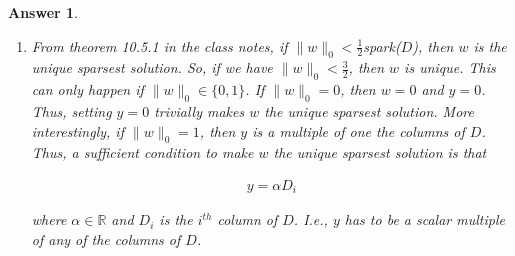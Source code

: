 \documentclass[12pt]{article}
\theoremstyle{colon}
\newtheorem*{answer}{Answer}
\begin{document}
\begin{answer}
\begin{enumerate}[label=\alph*)]
    \item From theorem 10.5.1 in the class notes, if $\lVert w \rVert_0 < \frac{1}{2}$spark($D$), then $w$ is the unique sparsest solution. So, if we have $\lVert w \rVert_0 < \frac{3}{2}$, then $w$ is unique. This can only happen if $\lVert w \rVert_0 \in \{0, 1\}$. If $\lVert w \rVert_0 = 0$, then $w = 0$ and $y = 0$. Thus, setting $y = 0$ trivially makes $w$ the unique sparsest solution. More interestingly, if $\lVert w \rVert_0 = 1$, then $y$ is a multiple of one the columns of $D$. Thus, a sufficient condition to make $w$ the unique sparsest solution is that

      \begin{gather*}
        y = \alpha D_i
      \end{gather*}

      where $\alpha \in \mathbb{R}$ and $D_i$ is the $i^{th}$ column of $D$. I.e., $y$ has to be a scalar multiple of any of the columns of $D$.
  \end{enumerate}
\end{answer}
\end{document}
